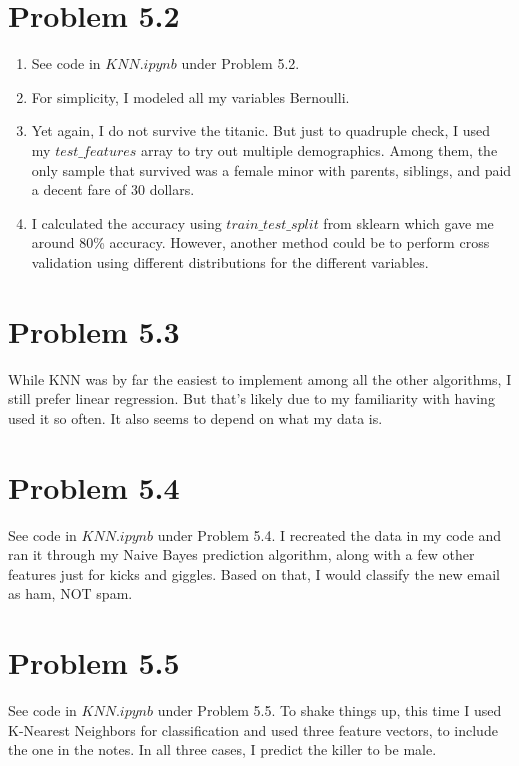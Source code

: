 \documentclass{article}
\begin{document}
\section*{Problem 5.2}
\begin{enumerate}[label=(\alph*)]
  \item See code in $KNN.ipynb$ under Problem 5.2.
  \item For simplicity, I modeled all my variables Bernoulli.
  \item Yet again, I do not survive the titanic. But just to quadruple check, I used my $test\_features$ array to try out multiple demographics. Among them, the only sample that survived was a female minor with parents, siblings, and paid a decent fare of 30 dollars.
  \item I calculated the accuracy using $train\_test\_split$ from sklearn which gave me around 80\% accuracy. However, another method could be to perform cross validation using different distributions for the different variables.
\end{enumerate}

\section*{Problem 5.3}

While KNN was by far the easiest to implement among all the other algorithms, I still prefer linear regression. But that's likely due to my familiarity with having used it so often. It also seems to depend on what my data is.

\section*{Problem 5.4}

See code in $KNN.ipynb$ under Problem 5.4. I recreated the data in my code and ran it through my Naive Bayes prediction algorithm, along with a few other features just for kicks and giggles. Based on that, I would classify the new email as ham, NOT spam.

\section*{Problem 5.5}
See code in $KNN.ipynb$ under Problem 5.5. To shake things up, this time I used K-Nearest Neighbors for classification and used three feature vectors, to include the one in the notes. In all three cases, I predict the killer to be male.
\end{document}
